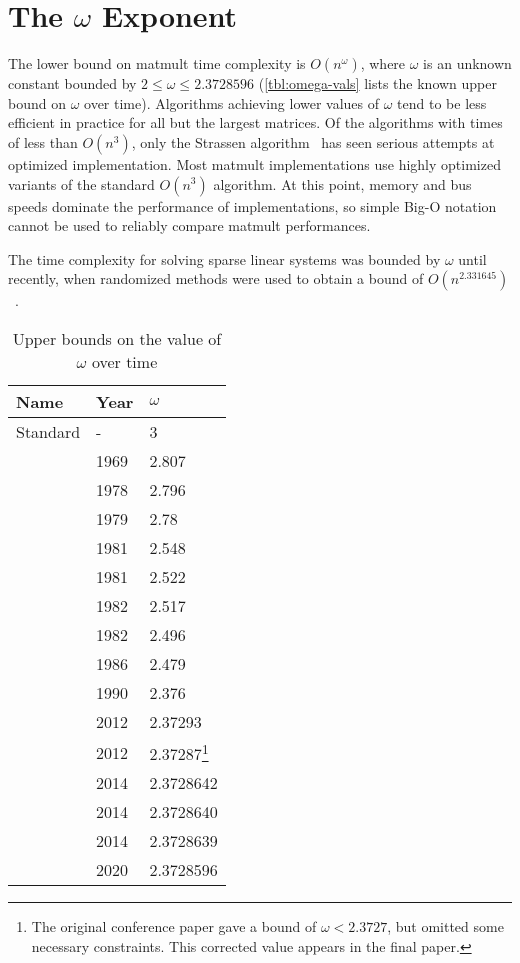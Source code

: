 \section{The $\omega$ Exponent}

The lower bound on matmult time complexity is $O(n^\omega)$, where $\omega$ is an unknown constant bounded by $2\le\omega\le2.3728596$ (\autoref{tbl:omega-vals} lists the known upper bound on $\omega$ over time). Algorithms achieving lower values of $\omega$ tend to be less efficient in practice for all but the largest matrices. Of the algorithms with times of less than $O(n^3)$, only the Strassen algorithm~\citep{Strassen1969} has seen serious attempts at optimized implementation. Most matmult implementations use highly optimized variants of the standard $O(n^3)$ algorithm. At this point, memory and bus speeds dominate the performance of implementations, so simple Big-O notation cannot be used to reliably compare matmult performances.

The time complexity for solving sparse linear systems was bounded by $\omega$ until recently, when randomized methods were used to obtain a bound of $O(n^{2.331645})$~\citep{Peng2021}.

\begin{table}
\centering
\begin{tabular}{lll}
\textbf{Name}           & \textbf{Year} & $\omega$  \\ \hline
Standard                & -             & 3         \\
\citet{Strassen1969}    & 1969          & 2.807     \\
\citet{Pan1978}         & 1978          & 2.796     \\
\citet{Bini1979}        & 1979          & 2.78      \\
\citet{Schonhage1981}   & 1981          & 2.548     \\
\citet{Schonhage1981}   & 1981          & 2.522     \\
\citet{Romani1982}      & 1982          & 2.517     \\
\citet{Coppersmith1982} & 1982          & 2.496     \\
\citet{Strassen1986}    & 1986          & 2.479     \\
\citet{Copper1990}      & 1990          & 2.376     \\
\citet{Williams2012}    & 2012          & 2.37293   \\
\citet{Williams2012}    & 2012          & 2.37287\footnote{The original conference paper gave a bound of $\omega<2.3727$, but omitted some necessary constraints. This corrected value appears in the final paper.}   \\
\citet{LeGall2014}      & 2014          & 2.3728642 \\
\citet{LeGall2014}      & 2014          & 2.3728640 \\
\citet{LeGall2014}      & 2014          & 2.3728639 \\
\citet{Alman2020}       & 2020          & 2.3728596
\end{tabular}
\caption{Upper bounds on the value of $\omega$ over time \label{tbl:omega-vals}}
\end{table}


